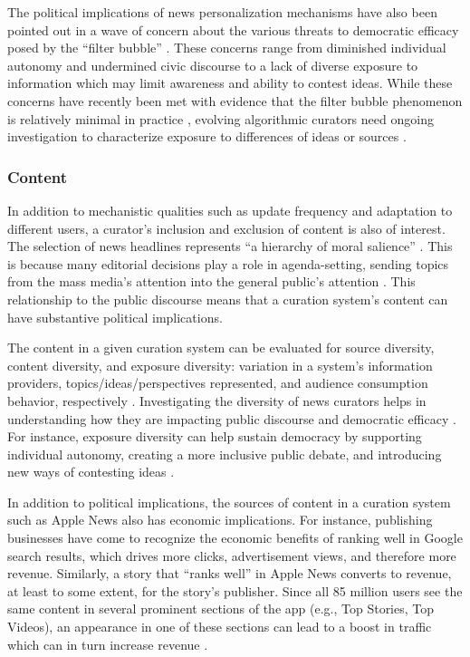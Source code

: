 The political implications of news personalization mechanisms have also been pointed out in a wave of concern about the various threats to democratic efficacy posed by the ``filter bubble'' \citep{Pariser,Bozdag2015,Helberger2018,Flaxman}. These concerns range from diminished individual autonomy and undermined civic discourse to a lack of diverse exposure to information which may limit awareness and ability to contest ideas. While these concerns have recently been met with evidence that the filter bubble phenomenon is relatively minimal in practice \citep{Haim2018,Trilling2018}, evolving algorithmic curators need ongoing investigation to characterize exposure to differences of ideas or sources \citep{Diakopoulos2019}.

\subsubsection{Content}
In addition to mechanistic qualities such as update frequency and adaptation to different users, a curator's inclusion and exclusion of content is also of interest. The selection of news headlines represents ``a hierarchy of moral salience'' \citep{Schudson1995}. This is because many editorial decisions play a role in agenda-setting, sending topics from the mass media's attention into the general public's attention \citep{McCombs2005}. This relationship to the public discourse means that a curation system's content can have substantive political implications.

The content in a given curation system can be evaluated for source diversity, content diversity, and exposure diversity: variation in a system's information providers, topics/ideas/perspectives represented, and audience consumption behavior, respectively \citep{Napoli2011}. Investigating the diversity of news curators helps in understanding how they are impacting public discourse and democratic efficacy \citep{Nechushtai2019}. For instance, exposure diversity can help sustain democracy by supporting individual autonomy, creating a more inclusive public debate, and introducing new ways of contesting ideas \citep{Helberger2018}.

In addition to political implications, the sources of content in a curation system such as Apple News also has economic implications. For instance, publishing businesses have come to recognize the economic benefits of ranking well in Google search results, which drives more clicks, advertisement views, and therefore more revenue. Similarly, a story that ``ranks well'' in Apple News converts to revenue, at least to some extent, for the story's publisher. Since all 85 million users see the same content in several prominent sections of the app (e.g., Top Stories, Top Videos), an appearance in one of these sections can lead to a boost in traffic which can in turn increase revenue \citep{Nicas2018,Oremus2018,Dotan2018}.

